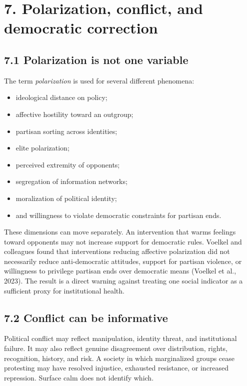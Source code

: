 \documentclass[
  11pt,
]{article}
\providecommand{\tightlist}{%
  \setlength{\itemsep}{0pt}\setlength{\parskip}{0pt}}
\begin{document}
\section{7. Polarization, conflict, and democratic
correction}\label{polarization-conflict-and-democratic-correction}

\subsection{7.1 Polarization is not one
variable}\label{polarization-is-not-one-variable}

The term \emph{polarization} is used for several different phenomena:

\begin{itemize}
\tightlist
\item
  ideological distance on policy;
\item
  affective hostility toward an outgroup;
\item
  partisan sorting across identities;
\item
  elite polarization;
\item
  perceived extremity of opponents;
\item
  segregation of information networks;
\item
  moralization of political identity;
\item
  and willingness to violate democratic constraints for partisan ends.
\end{itemize}

These dimensions can move separately. An intervention that warms
feelings toward opponents may not increase support for democratic rules.
Voelkel and colleagues found that interventions reducing affective
polarization did not necessarily reduce anti-democratic attitudes,
support for partisan violence, or willingness to privilege partisan ends
over democratic means (Voelkel et al., 2023). The result is a direct
warning against treating one social indicator as a sufficient proxy for
institutional health.

\subsection{7.2 Conflict can be
informative}\label{conflict-can-be-informative}

Political conflict may reflect manipulation, identity threat, and
institutional failure. It may also reflect genuine disagreement over
distribution, rights, recognition, history, and risk. A society in which
marginalized groups cease protesting may have resolved injustice,
exhausted resistance, or increased repression. Surface calm does not
identify which.
\end{document}
